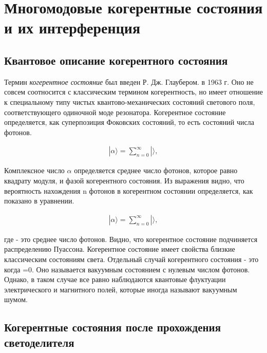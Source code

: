 \chapter{Многомодовые когерентные состояния и их интерференция}  \label{ch:ch4}
\section{Квантовое описание когерентного состояния} \label{sec:ch4/sec1}

Термин \textit{когерентное состояние} был введен Р. Дж. Глаубером. в 1963 г. Оно не совсем соотносится с классическим термином когерентность, но имеет отношение к специальному типу чистых квантово-механических состояний светового поля, соответствующего одиночной моде резонатора. Когерентное состояние определяется, как суперпозиция Фоковских состояний, то есть состояний числа фотонов. 


\begin{equation}
	\begin{aligned}
		|\alpha \rangle = \sum_{n=0}^\infty   |  \rangle,
	\end{aligned}
\end{equation}

Комплексное число $ \alpha $	определяется среднее число фотонов, которое равно квадрату модуля, и фазой когерентного состояния. Из выражения видно, что вероятность нахождения n фотонов в когерентном состоянии определяется, как показано в уравнении. 

\begin{equation}
	\begin{aligned}
		|\alpha \rangle = \sum_{n=0}^\infty   |  \rangle,
	\end{aligned}
\end{equation}

где - это среднее число фотонов. Видно, что когерентное состояние подчиняется распределению Пуассона. Когерентное состояние имеет свойства близкие классическим состояниям света. Отдельный случай когерентного состояния - это когда =0. Оно называется вакуумным состоянием с нулевым числом фотонов. Однако, в таком случае все равно наблюдаются квантовые флуктуации электрического и магнитного полей, которые иногда называют вакуумным шумом. 



\section{Когерентные состояния после прохождения светоделителя} \label{ch:ch4/sec2}
 
